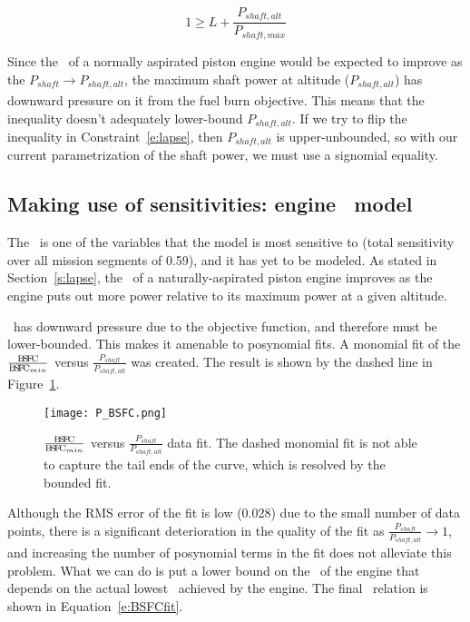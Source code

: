 \begin{equation}
    \label{e:lapse}
    1 \geq L + \frac{P_{shaft,alt}}{P_{shaft,max}}
\end{equation}

Since the \BSFC~of a normally aspirated piston engine would be expected to improve
as the $P_{shaft} \xrightarrow[]{} P_{shaft,alt}$, the maximum shaft
power at altitude ($P_{shaft,alt}$) has downward pressure on it from the fuel burn objective. This means that the
inequality doesn't adequately lower-bound $P_{shaft,alt}$. If we try to flip the inequality in
Constraint~\ref{e:lapse}, then $P_{shaft,alt}$ is upper-unbounded, so with our current parametrization
of the shaft power, we must use a signomial equality.

\subsection{Making use of sensitivities: engine \BSFC~model}
\label{s:BSFC}

The \BSFC~is one of the variables that the model is most sensitive to (total sensitivity over all mission segments of 0.59),
and it has yet to be modeled. As
stated in Section~\ref{s:lapse}, the \BSFC~of a naturally-aspirated piston engine improves as the engine
puts out more power relative to its maximum power at a given altitude.

\BSFC~has downward pressure due to the objective function, and therefore must be lower-bounded. This makes
it amenable to posynomial fits.
A monomial fit of the $\frac{\BSFC}{\BSFC_{min}}$ versus $\frac{P_{shaft}}{P_{shaft,alt}}$ was created.
The result is shown by the dashed line in Figure~\ref{f:P_BSFC}.

\begin{figure}
    \centering
    \texttt{[image: P\_BSFC.png]}
    \caption[$\frac{\BSFC}{\BSFC_{min}}$ versus $\frac{P_{shaft}}{P_{shaft,alt}}$ data fit.]{$\frac{\BSFC}{\BSFC_{min}}$
    versus $\frac{P_{shaft}}{P_{shaft,alt}}$ data fit. The dashed monomial fit is
    not able to capture the tail ends of the curve, which is resolved by the bounded fit.}
    \label{f:P_BSFC}
\end{figure}

Although the RMS error of the fit is low (0.028) due to the small number of data points,
there is a significant deterioration in the quality of the
fit as $\frac{P_{shaft}}{P_{shaft,alt}} \xrightarrow[]{} 1$,
and increasing the number of posynomial terms in the fit does not alleviate this problem.
What we can do is put a lower bound on the \BSFC~of the engine that depends on the actual
lowest \BSFC~achieved by the engine. The final \BSFC~relation is shown in Equation~\ref{e:BSFCfit}.

